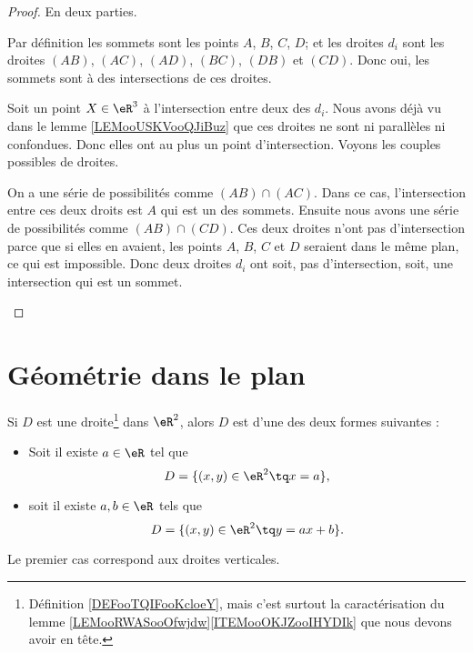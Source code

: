 \begin{proof}
	En deux parties.
	\begin{subproof}

		Par définition les sommets sont les points \( A \), \( B\), \( C\), \( D\); et les droites \( d_i\) sont les droites \( (AB)\), \( (AC)\), \( (AD)\), \( (BC)\), \( (DB)\) et \( (CD)\). Donc oui, les sommets sont à des intersections de ces droites.

		Soit un point \( X\in \eR^3\) à l'intersection entre deux des \( d_i\). Nous avons déjà vu dans le lemme \ref{LEMooUSKVooQJiBuz} que ces droites ne sont ni parallèles ni confondues. Donc elles ont au plus un point d'intersection. Voyons les couples possibles de droites.

		On a une série de possibilités comme \( (AB)\cap(AC)\). Dans ce cas, l'intersection entre ces deux droits est \( A\) qui est un des sommets. Ensuite nous avons une série de possibilités comme \( (AB)\cap (CD)\). Ces deux droites n'ont pas d'intersection parce que si elles en avaient, les points \( A\), \( B\), \( C\) et \( D\) seraient dans le même plan, ce qui est impossible.
		Donc deux droites \( d_i\) ont soit, pas d'intersection, soit, une intersection qui est un sommet.
	\end{subproof}
\end{proof}

\section{Géométrie dans le plan}

\begin{lemma}       \label{LEMooYIHXooEwmlPo}
    Si \( D\) est une droite\footnote{Définition \ref{DEFooTQIFooKcloeY}, mais c'est surtout la caractérisation du lemme \ref{LEMooRWASooOfwjdw}\ref{ITEMooOKJZooIHYDIk} que nous devons avoir en tête.} dans \( \eR^2\), alors \( D\) est d'une des deux formes suivantes :
	\begin{itemize}
		\item Soit il existe \( a\in \eR\) tel que
		      \begin{equation}
			      D=\{ (x,y)\in \eR^2\tq x=a \},
		      \end{equation}
		\item soit il existe \( a,b\in \eR\) tels que
		      \begin{equation}
			      D=\{ (x,y)\in \eR^2\tq y=ax+b \}.
		      \end{equation}
	\end{itemize}
	Le premier cas correspond aux droites verticales.
\end{lemma}

